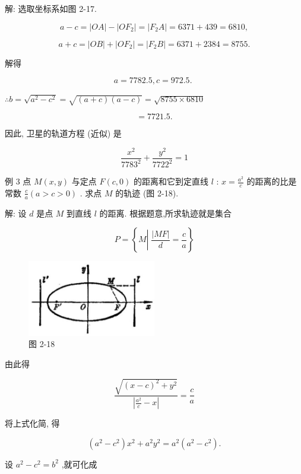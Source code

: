 \documentclass[lang=cn,newtx,10pt,scheme=chinese]{elegantbook}
\begin{document}
解: 选取坐标系如图 2-17.

\[
  a - c = \left| {OA}\right| - \left| {O{F}_{2}}\right| = \left| {{F}_{2}A}\right| = {6371} + {439} = {6810},
\]

\[
  a + c = \left| {OB}\right| + \left| {O{F}_{2}}\right| = \left| {{F}_{2}B}\right| = {6371} + {2384} = {8755}.
\]

解得

\[
  a = {7782.5},c = {972.5}\text{. }
\]

\(\therefore b = \sqrt{{a}^{2} - {c}^{2}} = \sqrt{\left( {a + c}\right) \left( {a - c}\right) } = \sqrt{{8755} \times {6810}}\)

\[
  = {7721.5}\text{.}
\]

因此, 卫星的轨道方程 (近似) 是

\[
  \frac{{x}^{2}}{{7783}^{2}} + \frac{{y}^{2}}{{7722}^{2}} = 1
\]

例 3 点 \(M\left( {x,y}\right)\) 与定点 \(F\left( {c,0}\right)\) 的距离和它到定直线 \(l\) : \(x = \frac{{a}^{2}}{c}\) 的距离的比是常数 \(\frac{c}{a}\left( {a > c > 0}\right)\) . 求点 \(M\) 的轨迹 (图 2-18).

解: 设 \(d\) 是点 \(M\) 到直线 \(l\) 的距离. 根据题意,所求轨迹就是集合

\[
  P = \left\{ {M\left| {\;\frac{\left| MF\right| }{d} = \frac{c}{a}}\right. }\right\}
\]

\begin{figure}[h]
  \centering
  \includegraphics[max width=0.5\textwidth]{images/01912cc2-ffb6-728e-9ae7-b113ff05c64b_93_181051.jpg}
  \caption{图 2-18}
\end{figure}



由此得

\[
  \frac{\sqrt{{\left( x - c\right) }^{2} + {y}^{2}}}{\left| \frac{{a}^{2}}{c} - x\right| } = \frac{c}{a}
\]

将上式化简, 得

\[
  \left( {{a}^{2} - {c}^{2}}\right) {x}^{2} + {a}^{2}{y}^{2} = {a}^{2}\left( {{a}^{2} - {c}^{2}}\right) .
\]

设 \({a}^{2} - {c}^{2} = {b}^{2}\) ,就可化成
\end{document}
